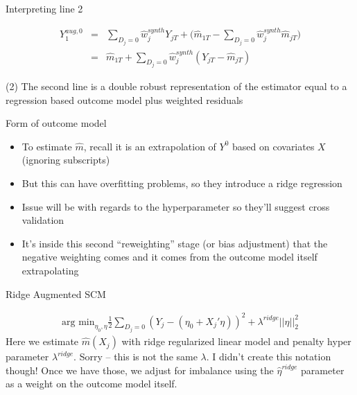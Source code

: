 \documentclass{beamer}
\begin{document}
\begin{frame}{Interpreting line 2}

\begin{eqnarray*}
Y_1^{aug,0}  &=& \sum_{D_j=0} \widehat{w}_j^{synth} Y_{jT} + \bigg (\widehat{m}_{1T} - \sum_{D_j=0} \widehat{w}_j^{synth}\widehat{m}_{jT} \bigg ) \\
&=& \widehat{m}_{1T} + \sum_{D_j=0} \widehat{w}_j^{synth} (Y_{jT} - \widehat{m}_{jT})
\end{eqnarray*}

(2) The second line is a double robust representation of the estimator equal to a regression based outcome model plus weighted residuals


\end{frame}

\begin{frame}{Form of outcome model}

\begin{itemize}

\item To estimate $\widehat{m}$, recall it is an extrapolation of $Y^0$ based on covariates $X$ (ignoring subscripts)
\item But this can have overfitting problems, so they introduce a ridge regression
\item Issue will be with regards to the hyperparameter so they'll suggest cross validation
\item It's inside this second ``reweighting'' stage (or bias adjustment) that the negative weighting comes and it comes from the outcome model itself extrapolating

\end{itemize}

\end{frame}




\begin{frame}{Ridge Augmented SCM}

\begin{eqnarray*}
\textrm{arg min}_{\eta_0,\eta} \frac{1}{2} \sum_{D_j=0} (Y_j - (\eta_0 + X_j'\eta))^2 + \lambda^{ridge} || \eta ||_2^2
\end{eqnarray*}Here we estimate $\widehat{m}(X_j)$ with ridge regularized linear model and penalty hyper parameter $\lambda^{ridge}$. Sorry -- this is not the same $\lambda$. I didn't create this notation though! Once we have those, we adjust for imbalance using the $\widehat{\eta}^{ridge}$ parameter as a weight on the outcome model itself. 

\end{frame}
\end{document}

